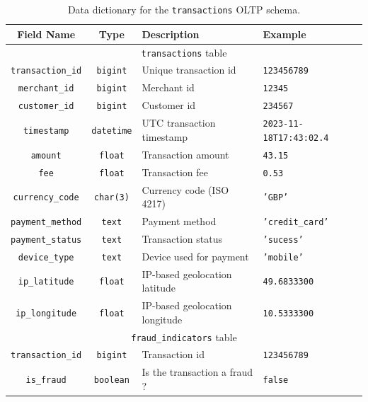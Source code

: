 \documentclass[11pt,a4paper,computermodern]{article}
\newcommand{\code}{\texttt}
\begin{document}
\begin{table}[ht]
	\centering
	\begin{threeparttable}
		\caption{Data dictionary for the \code{transactions} OLTP schema.}
		\label{table:OLTP}
		\begin{tabularx}{0.99\textwidth}{c c >{\centering\arraybackslash}X >{\centering\arraybackslash}X}
			\toprule
			Field Name & Type & Description & Example  \\
			\midrule
			\multicolumn{4}{c}{\code{transactions} table}\\
			\code{transaction\_id} & \code{bigint} & Unique transaction id & \code{123456789} \\
			\code{merchant\_id} & \code{bigint} & Merchant id & \code{12345} \\
			\code{customer\_id} & \code{bigint} & Customer id & \code{234567} \\
			\code{timestamp} & \code{datetime} & UTC transaction timestamp & \code{2023-11-18T17:43:02.4} \\
			\code{amount} & \code{float} & Transaction amount & \code{43.15} \\
			\code{fee} & \code{float} & Transaction fee & \code{0.53} \\
			\code{currency\_code} & \code{char(3)} & Currency code (ISO 4217) & \code{'GBP'} \\
			\code{payment\_method} & \code{text} & Payment method & \code{'credit\_card'} \\
			\code{payment\_status} & \code{text} & Transaction status & \code{'sucess'} \\
			\code{device\_type} & \code{text} & Device used for payment & \code{'mobile'} \\
			\code{ip\_latitude} & \code{float} & IP-based geolocation latitude & \code{49.6833300} \\
			\code{ip\_longitude} & \code{float} & IP-based geolocation longitude & \code{10.5333300} \\
			
			\midrule
			\multicolumn{4}{c}{\code{fraud\_indicators} table}\\
			\code{transaction\_id} & \code{bigint} & Transaction id & \code{123456789} \\
			\code{is\_fraud} & \code{boolean} & Is the transaction a fraud ? & \code{false} \\
			\bottomrule
		\end{tabularx}
	\end{threeparttable}
\end{table}
\end{document}
